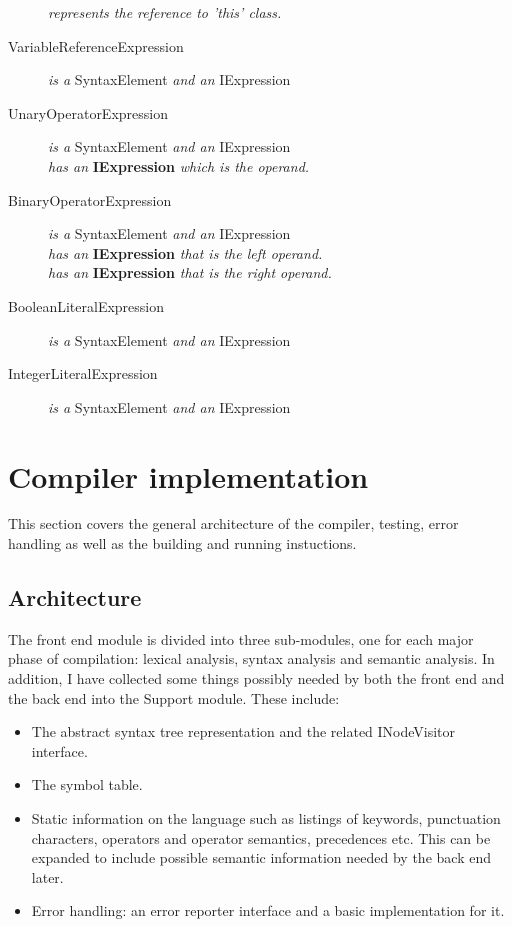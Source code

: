 \documentclass[a4paper,11pt]{article}
\begin{document}
\begin{description}
\emph{represents the reference to 'this' class.}
\item[VariableReferenceExpression] \emph{is a} SyntaxElement \emph{and an} IExpression
\item[UnaryOperatorExpression] \emph{is a} SyntaxElement \emph{and an} IExpression \\
\emph{has an} \textbf{IExpression} \emph{which is the operand.}
\item[BinaryOperatorExpression] \emph{is a} SyntaxElement \emph{and an} IExpression \\
\emph{has an} \textbf{IExpression} \emph{that is the left operand.} \\
\emph{has an} \textbf{IExpression} \emph{that is the right operand.}
\item[BooleanLiteralExpression] \emph{is a} SyntaxElement \emph{and an} IExpression
\item[IntegerLiteralExpression] \emph{is a} SyntaxElement \emph{and an} IExpression
\end{description}

\section{Compiler implementation}

This section covers the general architecture of the compiler, testing, error handling as well as the building and running instuctions.

\subsection{Architecture}

The front end module is divided into three sub-modules, one for each major phase of compilation: lexical analysis, syntax analysis and semantic analysis. In addition, I have collected some things possibly needed by both the front end and the back end into the Support module. These include:
\begin{itemize}
\item The abstract syntax tree representation and the related INodeVisitor interface.
\item The symbol table.
\item Static information on the language such as listings of keywords, punctuation characters, operators and operator semantics, precedences etc. This can be expanded to include possible semantic information needed by the back end later.
\item Error handling: an error reporter interface and a basic implementation for it.
\end{itemize}
\end{document}
